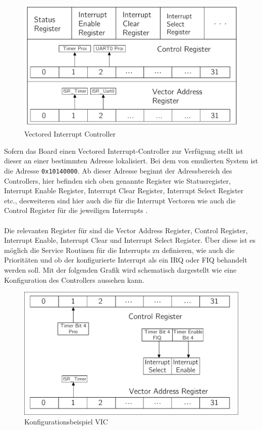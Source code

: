 \begin{figure}[H]
	\begin{center}	
	\caption{Vectored Interrupt Controller}
	\includegraphics[scale=0.60]{common/vic.pdf}
	\end{center}
	\label{vicSchema}
\end{figure}
\noindent
Sofern das Board einen Vectored Interrupt-Controller zur Verf\"ugung stellt ist dieser an einer bestimmten Adresse lokalisiert. Bei dem von \mops emulierten System ist die Adresse \texttt{0x10140000}\parencite[vgl.][223]{archManI}. Ab dieser Adresse beginnt der Adressbereich des Controllers, hier befinden sich oben genannte Register wie Statusregister, Interrupt Enable Register, Interrupt Clear Register, Interrupt Select Register etc., desweiteren sind hier auch die f\"ur die Interrupt Vectoren wie auch die Control Register f\"ur die jeweiligen Interrupts \parencite[vgl.][35]{vic}.\\\\
Die relevanten Register f\"ur \mops sind die Vector Address Register, Control Register, Interrupt Enable, Interrupt Clear und Interrupt Select Register. \"Uber diese ist es m\"oglich die Service Routinen f\"ur die Interrupts zu definieren, wie auch die Priorit\"aten und ob der konfigurierte Interrupt als ein IRQ oder FIQ behandelt werden soll. Mit der folgenden Grafik wird schematisch dargestellt wie eine Konfiguration des Controllers aussehen kann.
\begin{figure}[H]
	\begin{center}	
	\caption{Konfigurationsbeispiel VIC}
	\includegraphics[scale=0.60]{common/vicsample.pdf}
	\end{center}
	\label{draft:vicSample}
\end{figure}
